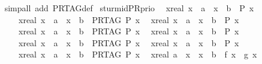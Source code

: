 \begin{isabellebody}
%
\isadelimproof
\ \ %
\endisadelimproof
%
\isatagproof
{}\isamarkupfalse%
\ {\isacharparenleft}simp{\isacharunderscore}all\ add{\isacharcolon}\ PR{\isacharunderscore}TAG{\isacharunderscore}def{\isacharparenright}%
\endisatagproof
{\isafoldproof}%
%
\isadelimproof
\isanewline
%
\endisadelimproof
\isanewline
{}\isamarkupfalse%
\ sturm{\isacharunderscore}id{\isacharunderscore}PR{\isacharunderscore}prio{}{\isacharcolon}\isanewline
\ \ {\isachardoublequoteopen}{\isacharbraceleft}x{\isacharcolon}{\isacharcolon}real{\isachardot}\ x\ {\isachargreater}\ a\ {\isasymand}\ x\ {\isasymle}\ b\ {\isasymand}\ P\ x{\isacharbraceright}\ {\isacharequal}\ \isanewline
\ \ \ \ \ \ \ {\isacharbraceleft}x{\isacharcolon}{\isacharcolon}real{\isachardot}\ x\ {\isachargreater}\ a\ {\isasymand}\ x\ {\isasymle}\ b\ {\isasymand}\ PR{\isacharunderscore}TAG\ P\ x{\isacharbraceright}{\isachardoublequoteclose}\isanewline
\ \ {\isachardoublequoteopen}{\isacharbraceleft}x{\isacharcolon}{\isacharcolon}real{\isachardot}\ x\ {\isasymge}\ a\ {\isasymand}\ x\ {\isasymle}\ b\ {\isasymand}\ P\ x{\isacharbraceright}\ {\isacharequal}\ \isanewline
\ \ \ \ \ \ \ {\isacharbraceleft}x{\isacharcolon}{\isacharcolon}real{\isachardot}\ x\ {\isasymge}\ a\ {\isasymand}\ x\ {\isasymle}\ b\ {\isasymand}\ PR{\isacharunderscore}TAG\ P\ x{\isacharbraceright}{\isachardoublequoteclose}\isanewline
\ \ {\isachardoublequoteopen}{\isacharbraceleft}x{\isacharcolon}{\isacharcolon}real{\isachardot}\ x\ {\isasymge}\ a\ {\isasymand}\ x\ {\isacharless}\ b\ {\isasymand}\ P\ x{\isacharbraceright}\ {\isacharequal}\ \isanewline
\ \ \ \ \ \ \ {\isacharbraceleft}x{\isacharcolon}{\isacharcolon}real{\isachardot}\ x\ {\isasymge}\ a\ {\isasymand}\ x\ {\isacharless}\ b\ {\isasymand}\ PR{\isacharunderscore}TAG\ P\ x{\isacharbraceright}{\isachardoublequoteclose}\isanewline
\ \ {\isachardoublequoteopen}{\isacharbraceleft}x{\isacharcolon}{\isacharcolon}real{\isachardot}\ x\ {\isachargreater}\ a\ {\isasymand}\ x\ {\isacharless}\ b\ {\isasymand}\ P\ x{\isacharbraceright}\ {\isacharequal}\ \isanewline
\ \ \ \ \ \ \ {\isacharbraceleft}x{\isacharcolon}{\isacharcolon}real{\isachardot}\ x\ {\isachargreater}\ a\ {\isasymand}\ x\ {\isacharless}\ b\ {\isasymand}\ PR{\isacharunderscore}TAG\ P\ x{\isacharbraceright}{\isachardoublequoteclose}\isanewline
\ \ {\isachardoublequoteopen}{\isacharparenleft}{\isasymforall}x{\isacharcolon}{\isacharcolon}real{\isachardot}\ a\ {\isacharless}\ x\ {\isasymand}\ x\ {\isasymle}\ b\ {\isasymlongrightarrow}\ f\ x\ {\isacharless}\ g\ x{\isacharparenright}\ {\isacharequal}\ \isanewline

\end{isabellebody}
